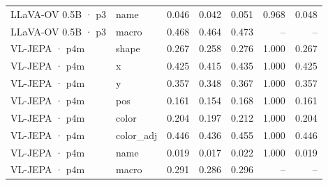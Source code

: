 \begin{tabular}{llrrrrr}
LLaVA-OV 0.5B · p3 & name & 0.046 & 0.042 & 0.051 & 0.968 & 0.048 \\
LLaVA-OV 0.5B · p3 & macro & 0.468 & 0.464 & 0.473 & -- & -- \\
VL-JEPA · p4m & shape & 0.267 & 0.258 & 0.276 & 1.000 & 0.267 \\
VL-JEPA · p4m & x & 0.425 & 0.415 & 0.435 & 1.000 & 0.425 \\
VL-JEPA · p4m & y & 0.357 & 0.348 & 0.367 & 1.000 & 0.357 \\
VL-JEPA · p4m & pos & 0.161 & 0.154 & 0.168 & 1.000 & 0.161 \\
VL-JEPA · p4m & color & 0.204 & 0.197 & 0.212 & 1.000 & 0.204 \\
VL-JEPA · p4m & color\_adj & 0.446 & 0.436 & 0.455 & 1.000 & 0.446 \\
VL-JEPA · p4m & name & 0.019 & 0.017 & 0.022 & 1.000 & 0.019 \\
VL-JEPA · p4m & macro & 0.291 & 0.286 & 0.296 & -- & -- \\
\bottomrule
\end{tabular}
